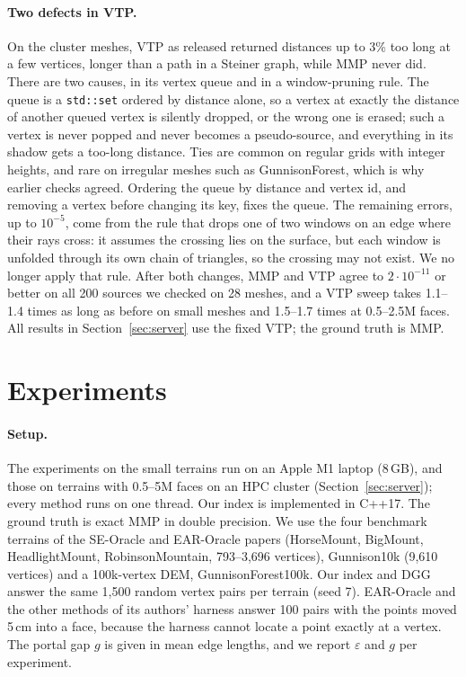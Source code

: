 \documentclass[sigconf,nonacm,screen]{acmart}
\newcommand{\eps}{\varepsilon}
\begin{document}
\paragraph{Two defects in VTP.}
On the cluster meshes, VTP as released returned distances up to 3\% too long at a few vertices, longer than a path
in a Steiner graph, while MMP never did. There are two causes, in its vertex queue and in a window-pruning rule. The queue is a
\texttt{std::set} ordered by distance alone, so a vertex at exactly the distance of another queued vertex is
silently dropped, or the wrong one is erased; such a vertex is never popped and never becomes a pseudo-source, and
everything in its shadow gets a too-long distance. Ties are common on regular grids with integer heights, and rare
on irregular meshes such as GunnisonForest, which is why earlier checks agreed. Ordering the queue by distance and
vertex id, and removing a vertex before changing its key, fixes the queue. The remaining errors, up to
$10^{-5}$, come from the rule that drops one of two windows on an edge where their rays cross: it assumes the
crossing lies on the surface, but each window is unfolded through its own chain of triangles, so the crossing may
not exist. We no longer apply that rule. After both changes, MMP and VTP agree to $2\cdot10^{-11}$ or better on all 200 sources we checked
on 28 meshes, and a VTP sweep takes 1.1--1.4 times as long as before on small meshes and 1.5--1.7 times at 0.5--2.5M faces. All results in
Section~\ref{sec:server} use the fixed VTP; the ground truth is MMP.

\section{Experiments}
\label{sec:experiments}

\paragraph{Setup.}
The experiments on the small terrains run on an Apple M1 laptop (8\,GB), and those on terrains with
0.5--5M faces on an HPC cluster (Section~\ref{sec:server}); every method runs on one thread. Our index is
implemented in C++17. The ground truth is exact MMP in double precision. We use the four benchmark terrains of the
SE-Oracle and EAR-Oracle papers (HorseMount, BigMount, HeadlightMount, RobinsonMountain, 793--3,696
vertices), Gunnison10k (9,610 vertices) and a 100k-vertex DEM, GunnisonForest100k. Our index and DGG answer the
same 1,500 random vertex pairs per terrain (seed 7). EAR-Oracle and the other methods of its authors' harness
answer 100 pairs with the points moved 5\,cm into a face, because the harness cannot locate a point exactly at a
vertex. The portal gap $g$ is given in mean edge lengths, and we report $\eps$ and $g$ per experiment.
\end{document}
